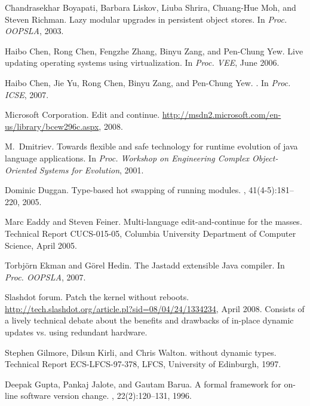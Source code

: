 \documentclass[9pt]{sigplanconf}
\begin{document}
\begin{thebibliography}{10}
Chandrasekhar Boyapati, Barbara Liskov, Liuba Shrira, Chuang-Hue Moh, and
  Steven Richman.
\newblock Lazy modular upgrades in persistent object stores.
\newblock In {\em Proc. OOPSLA}, 2003.

Haibo Chen, Rong Chen, Fengzhe Zhang, Binyu Zang, and Pen-Chung Yew.
\newblock Live updating operating systems using virtualization.
\newblock In {\em Proc. VEE}, June 2006.

Haibo Chen, Jie Yu, Rong Chen, Binyu Zang, and Pen-Chung Yew.
.
\newblock In {\em Proc. ICSE}, 2007.

Microsoft Corporation.
\newblock Edit and continue.
\newblock \url{http://msdn2.microsoft.com/en-us/library/bcew296c.aspx}, 2008.

M.~Dmitriev.
\newblock Towards flexible and safe technology for runtime evolution of java
  language applications.
\newblock In {\em Proc. Workshop on Engineering Complex Object-Oriented Systems
  for Evolution}, 2001.

Dominic Duggan.
\newblock Type-based hot swapping of running modules.
, 41(4-5):181--220, 2005.

Marc Eaddy and Steven Feiner.
\newblock Multi-language edit-and-continue for the masses.
\newblock Technical Report CUCS-015-05, Columbia University Department of
  Computer Science, April 2005.

Torbj\"{o}rn Ekman and G\"{o}rel Hedin.
\newblock The {Jastadd} extensible {Java} compiler.
\newblock In {\em Proc. OOPSLA}, 2007.

Slashdot forum.
\newblock Patch the kernel without reboots.
\newblock \url{http://tech.slashdot.org/article.pl?sid=08/04/24/1334234}, April
  2008.
\newblock Consists of a lively technical debate about the benefits and
  drawbacks of in-place dynamic updates vs. using redundant hardware.

Stephen Gilmore, Dilsun Kirli, and Chris Walton.
 without dynamic types.
\newblock Technical Report ECS-LFCS-97-378, LFCS, University of Edinburgh,
  1997.

Deepak Gupta, Pankaj Jalote, and Gautam Barua.
\newblock A formal framework for on-line software version change.
, 22(2):120--131, 1996.


\end{thebibliography}
\end{document}
